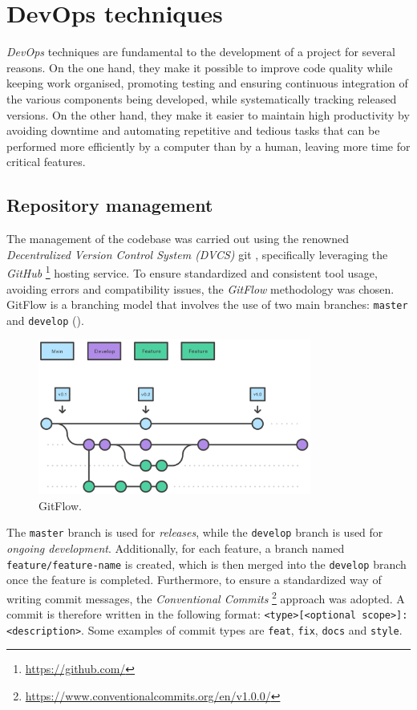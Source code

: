 \documentclass[12pt,a4paper,openright,twoside]{book}
\begin{document}
\section{DevOps techniques}

\emph{DevOps} techniques are fundamental to the development of a project for several reasons. On the one hand, 
    they make it possible to improve code quality while keeping work organised, promoting testing and 
    ensuring continuous integration of the various components being developed, while systematically 
    tracking released versions. On the other hand, they make it easier to maintain high productivity 
    by avoiding downtime and automating repetitive and tedious tasks that can be performed more efficiently 
    by a computer than by a human, leaving more time for critical features.

\subsection*{Repository management}
The management of the codebase was carried out using the renowned \emph{Decentralized Version Control System (DVCS)} git \cite{spinellis2012git}, 
    specifically leveraging the \emph{GitHub} \footnote{\url{https://github.com/}} hosting service. To ensure standardized and consistent tool usage, 
    avoiding errors and compatibility issues, the \emph{GitFlow} methodology was chosen.
    GitFlow is a branching model that involves the use of two main branches: \texttt{master} and \texttt{develop} ().
    \begin{figure}[t]
        \centering
        \includegraphics[width=0.8\textwidth]{figures/gitflow.png}
        \caption{GitFlow.}
        \label{fig:gitflow}
    \end{figure}
    The \texttt{master} branch is used for \emph{releases}, while the \texttt{develop} branch is used for \emph{ongoing development}. 
    Additionally, for each feature, a branch named \texttt{feature/feature-name} is created, which is then merged 
    into the \texttt{develop} branch once the feature is completed.
    Furthermore, to ensure a standardized way of writing commit messages, 
        the \emph{Conventional Commits} \footnote{\url{https://www.conventionalcommits.org/en/v1.0.0/}} 
        approach was adopted. A commit is therefore written in the following format: \texttt{<type>[<optional scope>]: <description>}.
        Some examples of commit types are \texttt{feat}, \texttt{fix}, \texttt{docs} and \texttt{style}.
\end{document}
